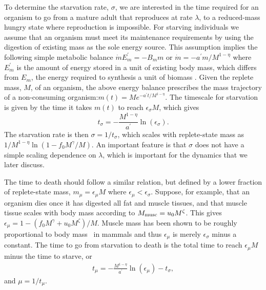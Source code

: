 \documentclass{pnastwo}
\begin{document}
\begin{article}
To determine the starvation rate, $\sigma$, we are interested in the time
required for an organism to go from a mature adult that reproduces at rate
$\lambda$, to a
reduced-mass hungry state where reproduction is impossible.  For starving individuals we assume that an organism must meet its maintenance requirements by using the digestion of existing mass as the sole energy source.
This assumption implies the following simple metabolic balance
$\dot{m}E_{m}^{\prime}=-B_{m}m$ or $\dot{m}=-a^{\prime}m/M^{1-\eta}$
where $E_{m}^{\prime}$ is the amount of energy stored in a unit of existing
body mass, which differs from $E_{m}$, the energy required to
synthesis a unit of biomass \cite{hou}. Given the replete mass, $M$, of an organism, the
above energy balance prescribes the mass trajectory of a non-consuming
organism:$m\left(t\right)=Me^{-a^{\prime}t/M^{1-\eta}}$.
The timescale for starvation is
given by the time it takes $m(t)$ to reach $\epsilon_{\sigma} M$, which gives
\begin{equation}
\label{eq:sigma}
t_{\sigma}=-\frac{M^{1-\eta}}{a^{\prime}}\ln\left(\epsilon_{\sigma}\right).
\end{equation}
The starvation rate is then $\sigma=1/t_{\sigma}$, which scales with
replete-state mass as $1/M^{1-\eta}\ln\left(1-f_{0}M^{\gamma}/M\right)$.  An important
feature is that $\sigma$ does not have a simple scaling dependence on
$\lambda$, which is important for the dynamics that we
later discuss.

The time to death should follow a similar relation, but defined by a lower
fraction of replete-state mass, $m_{\mu}=\epsilon_{\mu} M$ where $\epsilon_\mu < \epsilon_\sigma$.
Suppose, for example, that an organism dies once it has digested all fat and
muscle tissues, and that muscle tissue scales with body mass according to
$M_{\rm musc}=u_{0}M^{\zeta}$.  This gives
$\epsilon_{\mu}=1-\left(f_{0}M^{\gamma}+u_{0}M^{\zeta}\right)/M$. Muscle
mass has been shown to be roughly proportional to body mass~\cite{Folland:2008ij} in
mammals and thus $\epsilon_{\mu}$ is merely $\epsilon_{\sigma}$ minus a constant. The time to go from starvation to death is the total time to reach $\epsilon_{\mu}M$ minus the time to starve, or
\begin{eqnarray}
\label{mutimescale}
t_{\mu}=-\frac{M^{1-\eta}}{a^{\prime}}\ln\left(\epsilon_{\mu}\right)-t_{\sigma},
\end{eqnarray}
and $\mu=1/t_{\mu}$.



\end{article}
\end{document}
